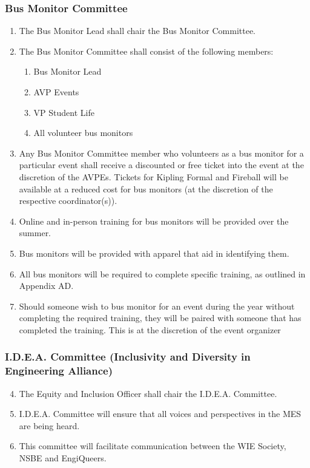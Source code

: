\hypertarget{bus-monitor-committee}{%
 \subsubsection{Bus Monitor Committee}
 \label{bus-monitor-committee}}
\begin{enumerate}
 \item
  The Bus Monitor Lead shall chair the Bus Monitor Committee.
 \item
  The Bus Monitor Committee shall consist of the following members:

  \begin{enumerate}
   \item
    Bus Monitor Lead
   \item
    AVP Events
   \item
    VP Student Life
   \item
    All volunteer bus monitors
  \end{enumerate}
 \item
  Any Bus Monitor Committee member who volunteers as a bus monitor for a
  particular event shall receive a discounted or free ticket into the
  event at the discretion of the AVPEs.\hspace{0pt} \hspace{0pt}Tickets
  for Kipling Formal and Fireball will be available at a reduced cost
  for bus monitors (at the discretion of the respective coordinator(s)).
 \item
  Online and in-person training for bus monitors will be provided over
  the summer.
 \item
  Bus monitors will be provided with apparel that aid in identifying
  them.
 \item
  \hspace{0pt}All bus monitors will be required to complete specific
  training, as outlined in Appendix AD.
 \item
  Should someone wish to bus monitor for an event during the year
  without completing the required training, they will be paired with
  someone that has completed the training. This is at the discretion of
  the event organizer

\end{enumerate}

\hypertarget{i.d.e.a.-committee-inclusivity-and-diversity-in-engineering-alliance}{%
 \subsubsection{I.D.E.A. Committee (Inclusivity and Diversity in
  Engineering
  Alliance)}
 \label{i.d.e.a.-committee-inclusivity-and-diversity-in-engineering-alliance}}
\begin{enumerate}
 \setcounter{enumi}{3}
 \item
  The Equity and Inclusion Officer shall chair the I.D.E.A. Committee.
 \item
  I.D.E.A. Committee will ensure that all voices and perspectives in the
  MES are being heard.
 \item
  This committee will facilitate communication between the WIE Society,
  NSBE and EngiQueers.
\end{enumerate}

